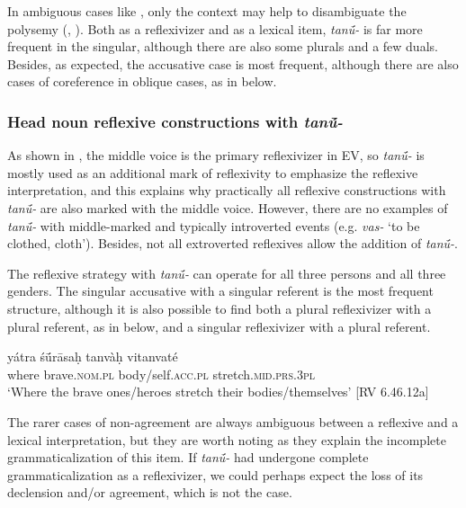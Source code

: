 \documentclass[output=paper]{langscibook}
\begin{document}
{In ambiguous cases like , only the context may help to disambiguate the polysemy (\citealt{Pinault2001}, \citealt{Kulikov2007Reflexive}). Both as a reflexivizer and as a lexical item, \textit{tan\'{ū}-} is far more frequent in the singular, although there are also some plurals and a few duals. Besides, as expected, the accusative case is most frequent, although there are also cases of coreference in oblique cases, as in  below.}


\subsubsection{Head noun reflexive constructions with \textit{tan\'{ū}-}}
\label{sec:Orqueda:2.2.2}


As shown in , the middle voice is the primary reflexivizer in EV, so \textit{tan\'{ū}-} is mostly used as an additional mark of reflexivity to emphasize the reflexive interpretation, and this explains why practically all reflexive constructions with \textit{tan\'{ū}-} are also marked with the middle voice. However, there are no examples of \textit{tan\'{ū}-} with middle-marked and typically introverted events (e.g. \textit{vas-} ‘to be clothed, cloth’). Besides, not all extroverted reflexives allow the addition of \textit{tan\'{ū}-}.

{The reflexive strategy with \textit{tan\'{ū}-} can operate for all three persons and all three genders. The singular accusative with a singular referent is the most frequent structure, although it is also possible to find both a plural reflexivizer with a plural referent, as in  below, and a singular reflexivizer with a plural referent.}

\ea\label{ex:Orqueda:15}
\gll yátra    ś\'{ū}rāsaḥ    tanvàḥ  vitanvaté\\
    where    brave.\textsc{nom.pl}    body/self.\textsc{acc.pl}  stretch.\textsc{mid.prs.3pl}\\
\glt ‘Where the brave ones/heroes stretch their bodies/themselves’ [RV 6.46.12a]
\z

{The rarer cases of non-agreement are always ambiguous between a reflexive and a lexical interpretation, but they are worth noting as they explain the incomplete grammaticalization of this item. If \textit{tan\'{ū}-} had undergone complete grammaticalization as a reflexivizer, we could perhaps expect the loss of its declension and/or agreement, which is not the case.}
\end{document}
